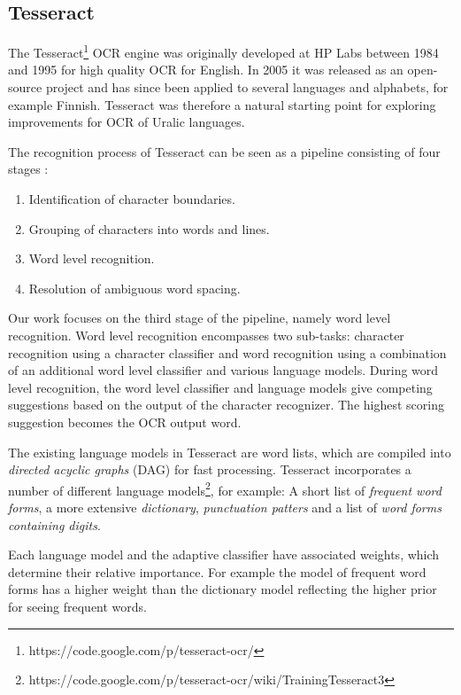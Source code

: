 \documentclass[b5paper]{article}
\begin{document}
\subsection{Tesseract}
The Tesseract\footnote{https://code.google.com/p/tesseract-ocr/} OCR
engine \cite{smith07} was originally developed at HP Labs between 1984
and 1995 for high quality OCR for English. In 2005 it was released as
an open-source project and has since been applied to several languages
and alphabets, for example Finnish. Tesseract was therefore a natural
starting point for exploring improvements for OCR of Uralic languages.

The recognition process of Tesseract can be seen as a pipeline
consisting of four stages \cite{smith07}:
\begin{enumerate}
\item Identification of character boundaries.
\item Grouping of characters into words and lines.
\item Word level recognition.
\item Resolution of ambiguous word spacing.
\end{enumerate}

Our work focuses on the third stage of the pipeline, namely word level
recognition. Word level recognition encompasses two sub-tasks: character
recognition using a character classifier and word recognition using a
combination of an additional word level classifier and various
language models. During word level recognition, the word level classifier
and language models give competing suggestions based on the output of
the character recognizer. 
The highest scoring suggestion becomes the OCR output word.

The existing language models in Tesseract are word lists, which are
compiled into {\it directed acyclic graphs} (DAG) for fast
processing. Tesseract incorporates a number of different language
models\footnote{https://code.google.com/p/tesseract-ocr/wiki/TrainingTesseract3},
for example: A short list of {\it frequent word forms}, a more
extensive {\it dictionary}, {\it punctuation patters} and a list of
{\it word forms containing digits}.

Each language model and the adaptive classifier have associated
weights, which determine their relative importance. For example the
model of frequent word forms has a higher weight than the dictionary
model reflecting the higher prior for seeing frequent words.
\end{document}
